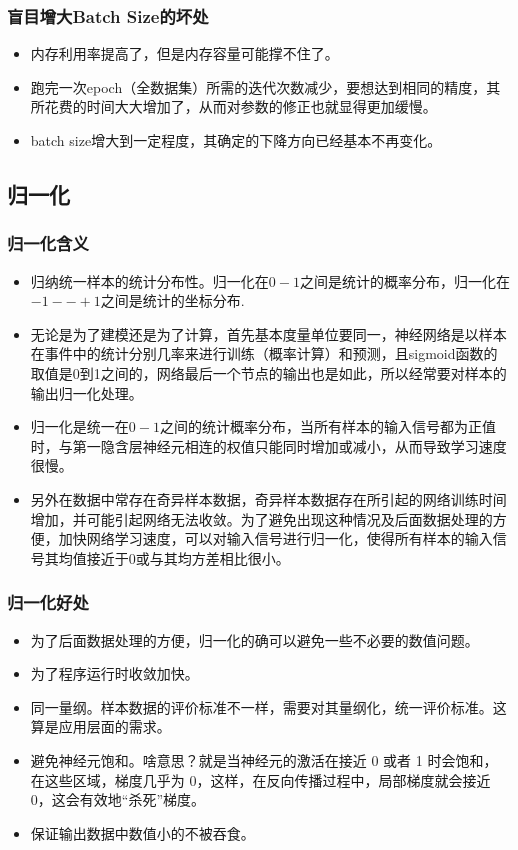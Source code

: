 \documentclass[UTF8]{ctexart}
\begin{document}
\subsubsection{盲目增大Batch Size的坏处}
\begin{itemize}
	\item 内存利用率提高了，但是内存容量可能撑不住了。
	\item 跑完一次epoch（全数据集）所需的迭代次数减少，要想达到相同的精度，其所花费的时间大大增加了，从而对参数的修正也就显得更加缓慢。
	\item batch size增大到一定程度，其确定的下降方向已经基本不再变化。
\end{itemize}

\subsection{归一化}
\subsubsection{归一化含义}
\begin{itemize}
	\item 归纳统一样本的统计分布性。归一化在$0-1$之间是统计的概率分布，归一化在$-1--+1$之间是统计的坐标分布.
	\item 无论是为了建模还是为了计算，首先基本度量单位要同一，神经网络是以样本在事件中的统计分别几率来进行训练（概率计算）和预测，且sigmoid函数的取值是0到1之间的，网络最后一个节点的输出也是如此，所以经常要对样本的输出归一化处理。
	\item 归一化是统一在$ 0-1 $之间的统计概率分布，当所有样本的输入信号都为正值时，与第一隐含层神经元相连的权值只能同时增加或减小，从而导致学习速度很慢。
	\item 另外在数据中常存在奇异样本数据，奇异样本数据存在所引起的网络训练时间增加，并可能引起网络无法收敛。为了避免出现这种情况及后面数据处理的方便，加快网络学习速度，可以对输入信号进行归一化，使得所有样本的输入信号其均值接近于0或与其均方差相比很小。
\end{itemize}
\subsubsection{归一化好处}
\begin{itemize}
	\item 为了后面数据处理的方便，归一化的确可以避免一些不必要的数值问题。
	\item 为了程序运行时收敛加快。
	\item 同一量纲。样本数据的评价标准不一样，需要对其量纲化，统一评价标准。这算是应用层面的需求。
	\item 避免神经元饱和。啥意思？就是当神经元的激活在接近 0 或者 1 时会饱和，在这些区域，梯度几乎为 0，这样，在反向传播过程中，局部梯度就会接近 0，这会有效地“杀死”梯度。
	\item 保证输出数据中数值小的不被吞食。 
\end{itemize}
\end{document}
